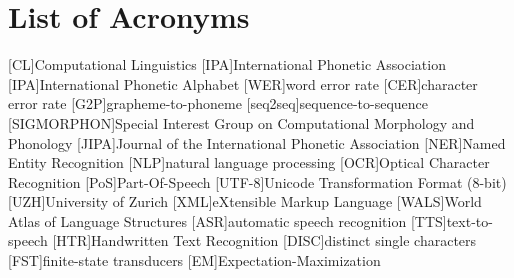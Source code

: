 {}
\chapter*{List of Acronyms}
\begin{acronym}[WER]\itemsep3pt
[CL]{Computational Linguistics}
[IPA]{International Phonetic Association}
[IPA]{International Phonetic Alphabet}
[WER]{word error rate}
[CER]{character error rate}
[G2P]{grapheme-to-phoneme} 
[seq2seq]{sequence-to-sequence} 
[SIGMORPHON]{Special Interest Group on Computational  Morphology and Phonology}
[JIPA]{Journal of the International Phonetic Association}
[NER]{Named Entity Recognition}
[NLP]{natural language processing}
[OCR]{Optical Character Recognition}
[PoS]{Part-Of-Speech}
[UTF-8]{Unicode Transformation Format (8-bit)}
[UZH]{University of Zurich}
[XML]{eXtensible Markup Language}
[WALS]{World Atlas of Language Structures}
[ASR]{automatic speech recognition}
[TTS]{text-to-speech}
[HTR]{Handwritten Text Recognition}
[DISC]{distinct single characters}
[FST]{finite-state transducers}
[EM]{Expectation-Maximization}
\end{acronym}